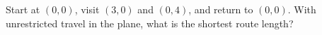 Start at $(0,0)$, visit $(3,0)$ and $(0,4)$, and return to $(0,0)$. With unrestricted travel in the plane, what is the shortest route length?
